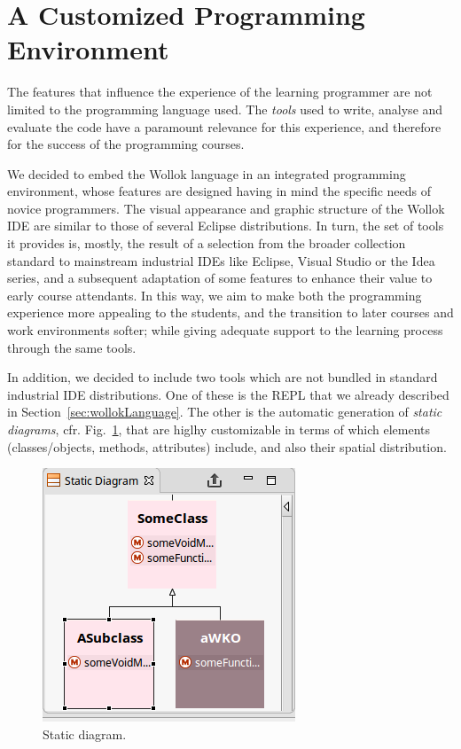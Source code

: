 \section{A Customized Programming Environment}
\label{sec:environment}

The features that influence the experience of the learning programmer are not limited to the programming language used. 
The \emph{tools} used to write, analyse and evaluate the code have a paramount relevance for this experience, and therefore for the success of the programming courses.

We decided to embed the Wollok language in an integrated programming environment, whose features are designed having in mind the specific needs of novice programmers.
The visual appearance and graphic structure of the Wollok IDE are similar to those of several Eclipse distributions. 
In turn, the set of tools it provides is, mostly, the result of a selection from the broader collection standard to mainstream industrial IDEs like Eclipse, Visual Studio or the Idea series, and a subsequent adaptation of some features to enhance their value to early course attendants.
In this way, we aim to make both the programming experience more appealing to the students, and the transition to later courses and work environments softer; while giving adequate support to the learning process through the same tools.

\medskip
In addition, we decided to include two tools which are not bundled in standard industrial IDE distributions. 
One of these is the REPL that we already described in Section~\ref{sec:wollokLanguage}.
The other is the automatic generation of \emph{static diagrams}, cfr. Fig.~\ref{fig:outline}, that are higlhy customizable in terms of which elements (classes/objects, methods, attributes) include, and also their spatial distribution.

\begin{figure}[ht]
 \centering
 \includegraphics[scale=0.5]{../images/staticDiagram.png}
 \caption{\small Static diagram.}
 \label{fig:outline}
\end{figure}

